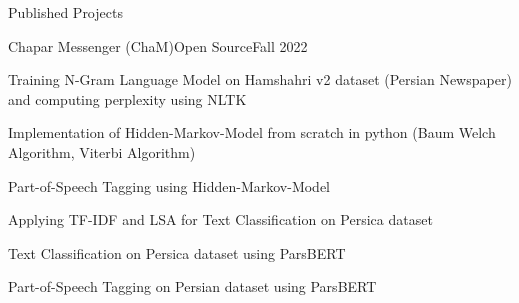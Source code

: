 \documentclass[]{main}
\begin{document}
\begin{section}{Published Projects}
 \begin{subsection}{Chapar Messenger (ChaM)}{Open Source}{Fall 2022}{}
     \item Training N-Gram Language Model on Hamshahri v2 dataset (Persian Newspaper) and computing perplexity using NLTK \;\href{https://github.com/ckoliber/nlpexercises/blob/main/src/exercise1.ipynb}{\faExternalLink*}
     \item Implementation of Hidden-Markov-Model from scratch in python (Baum Welch Algorithm, Viterbi Algorithm) \;\href{https://github.com/ckoliber/nlpexercises/blob/main/src/hmm/hmm.py}{\faExternalLink*}
     \item Part-of-Speech Tagging using Hidden-Markov-Model \;\href{https://github.com/ckoliber/nlpexercises/blob/main/src/exercise3.ipynb}{\faExternalLink*}
     \item Applying TF-IDF and LSA for Text Classification on Persica dataset \;\href{https://github.com/ckoliber/nlpexercises/blob/main/src/exercise4.ipynb}{\faExternalLink*}
     \item Text Classification on Persica dataset using ParsBERT \;\href{https://github.com/ckoliber/nlpexercises/blob/main/src/exercise5.ipynb}{\faExternalLink*}
     \item Part-of-Speech Tagging on Persian dataset using ParsBERT \;\href{https://github.com/ckoliber/nlpexercises/blob/main/src/exercise6.ipynb}{\faExternalLink*}
 \end{subsection}
\end{section}

\end{document}
